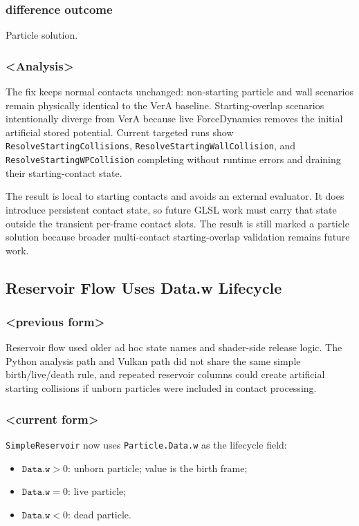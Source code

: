 \subsubsection{difference outcome}

Particle solution.

\subsubsection{<Analysis>}

The fix keeps normal contacts unchanged: non-starting particle and wall
scenarios remain physically identical to the VerA baseline.  Starting-overlap
scenarios intentionally diverge from VerA because live ForceDynamics removes
the initial artificial stored potential.  Current targeted runs show
\texttt{ResolveStartingCollisions}, \texttt{ResolveStartingWallCollision}, and
\texttt{ResolveStartingWPCollision} completing without runtime errors and
draining their starting-contact state.

The result is local to starting contacts and avoids an external evaluator.  It
does introduce persistent contact state, so future GLSL work must carry that
state outside the transient per-frame contact slots.  The result is still
marked a particle solution because broader multi-contact starting-overlap
validation remains future work.

\subsection{Reservoir Flow Uses Data.w Lifecycle}

\subsubsection{<previous form>}

Reservoir flow used older ad hoc state names and shader-side release logic.
The Python analysis path and Vulkan path did not share the same simple
birth/live/death rule, and repeated reservoir columns could create artificial
starting collisions if unborn particles were included in contact processing.

\subsubsection{<current form>}

\texttt{SimpleReservoir} now uses \texttt{Particle.Data.w} as the lifecycle
field:
\begin{itemize}
    \item \(\texttt{Data.w} > 0\): unborn particle; value is the birth frame;
    \item \(\texttt{Data.w} = 0\): live particle;
    \item \(\texttt{Data.w} < 0\): dead particle.
\end{itemize}


